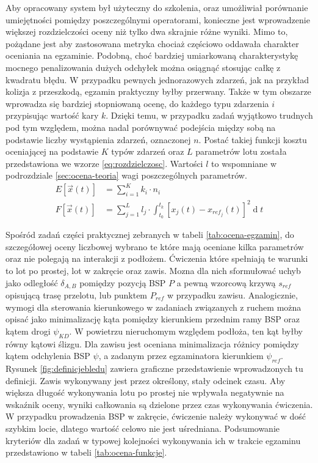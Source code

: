Aby opracowany system był użyteczny do szkolenia, oraz umożliwiał porównanie umiejętności pomiędzy poszczególnymi operatorami, konieczne jest wprowadzenie większej rozdzielczości oceny niż tylko dwa skrajnie różne wyniki. Mimo to, pożądane jest aby zastosowana metryka chociaż częściowo oddawała charakter oceniania na egzaminie. Podobną, choć bardziej umiarkowaną charakterystykę mocnego penalizowania dużych odchyłek można osiągnąć stosując całkę z kwadratu błędu. W przypadku pewnych jednorazowych zdarzeń, jak na przykład kolizja z przeszkodą, egzamin praktyczny byłby przerwany. Także w tym obszarze wprowadza się bardziej stopniowaną ocenę, do każdego typu zdarzenia $ i $ przypisując wartość kary $ k $. Dzięki temu, w przypadku zadań wyjątkowo trudnych pod tym względem, można nadal porównywać podejścia między sobą na podstawie liczby wystąpienia zdarzeń, oznaczonej $ n $. Postać takiej funkcji kosztu oceniającej na podstawie $ K $ typów zdarzeń oraz $ L $ parametrów lotu została przedstawiona we wzorze \ref{eq:rozdzielczosc}. Wartości $ l $ to wspomniane w podrozdziale \ref{sec:ocena-teoria} wagi poszczególnych parametrów.
\begin{align}
    \label{eq:rozdzielczosc}
    E[ \vec{x}(t) ] &= \sum_{i=1}^{K} k_i \cdot n_i
    \\
    F[ \vec{x}(t) ] &= \sum_{j=1}^{L} l_j \cdot \int_{t_0}^{t_k} [ x_j(t) - x_{ref_j}(t) ]^2 \operatorname{d}t
\end{align}

Spośród zadań części praktycznej zebranych w tabeli \ref{tab:ocena-egzamin}, do szczegółowej oceny liczbowej wybrano te które mają oceniane kilka parametrów oraz nie polegają na interakcji z podłożem. Ćwiczenia które spełniają te warunki to lot po prostej, lot w zakręcie oraz zawis. Mozna dla nich sformułować uchyb jako odległość $ \delta_{A,B} $ pomiędzy pozycją BSP $ P $ a pewną wzorcową krzywą $ s_{ref} $ opisującą trasę przelotu, lub punktem $ P_{ref} $ w przypadku zawisu. Analogicznie, wymogi dla sterowania kierunkowego w zadaniach związanych z ruchem można opisać jako minimalizację kąta pomiędzy kierunkiem przednim ramy BSP oraz kątem drogi $ \psi_{KD} $. W powietrzu nieruchomym względem podłoża, ten kąt byłby równy kątowi ślizgu. Dla zawisu jest oceniana minimalizacja różnicy pomiędzy kątem odchylenia BSP $ \psi $, a zadanym przez egzaminatora kierunkiem $ \psi_{ref} $. Rysunek \ref{fig:definicjebledu} zawiera graficzne przedstawienie wprowadzonych tu definicji. Zawis wykonywany jest przez określony, stały odcinek czasu. Aby większa długość wykonywania lotu po prostej nie wpływała negatywnie na wskaźnik oceny, wyniki całkowania są dzielone przez czas wykonywania ćwiczenia. W przypadku prowadzenia BSP w zakręcie, ćwiczenie należy wykonywać w dość szybkim locie, dlatego wartość celowo nie jest uśredniana. Podsumowanie kryteriów dla zadań w typowej kolejności wykonywania ich w trakcie egzaminu przedstawiono w tabeli \ref{tab:ocena-funkcje}.

